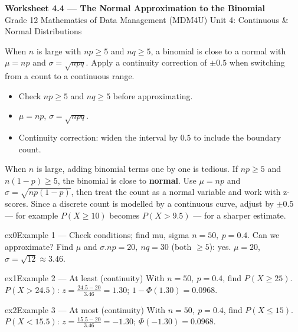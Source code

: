 \documentclass[11pt]{article}
\begin{document}
\begin{center}
{\LARGE\bfseries\color{titleblue}Worksheet 4.4 --- The Normal Approximation to the Binomial}\\[2pt]
{\small Grade 12 Mathematics of Data Management (MDM4U) \textperiodcentered{} Unit 4: Continuous \& Normal Distributions}
\end{center}

\begin{ideabox}
When $n$ is large with $np\ge5$ and $nq\ge5$, a binomial is close to a normal with $\mu=np$ and $\sigma=\sqrt{npq}$. Apply a continuity correction of $\pm0.5$ when switching from a count to a continuous range.
\begin{itemize}[leftmargin=*,itemsep=2pt]
  \item Check $np\ge5$ and $nq\ge5$ before approximating.
  \item $\mu=np$, $\sigma=\sqrt{npq}$.
  \item Continuity correction: widen the interval by $0.5$ to include the boundary count.
\end{itemize}
\end{ideabox}

\begin{learnbox}
When $n$ is large, adding binomial terms one by one is tedious. If $np\ge5$ and $n(1-p)\ge5$, the binomial is close to \textbf{normal}.
Use $\mu=np$ and $\sigma=\sqrt{np(1-p)}$, then treat the count as a normal variable and work with z-scores.
Since a discrete count is modelled by a continuous curve, adjust by $\pm0.5$ — for example $P(X\ge10)$ becomes $P(X>9.5)$ — for a sharper estimate.
\end{learnbox}


\begin{example}{ex0}{Example 1 --- Check conditions; find mu, sigma}
$n=50,\ p=0.4$. Can we approximate? Find $\mu$ and $\sigma$.\soln $np=20,\ nq=30$ (both $\ge5$): yes. $\mu=20$, $\sigma=\sqrt{12}\approx3.46$.
\end{example}

\begin{example}{ex1}{Example 2 --- At least (continuity)}
With $n=50,\ p=0.4$, find $P(X\ge25)$.\soln $P(X>24.5)$: $z=\tfrac{24.5-20}{3.46}=1.30$; $1-\Phi(1.30)=0.0968$.
\end{example}

\begin{example}{ex2}{Example 3 --- At most (continuity)}
With $n=50,\ p=0.4$, find $P(X\le15)$.\soln $P(X<15.5)$: $z=\tfrac{15.5-20}{3.46}=-1.30$; $\Phi(-1.30)=0.0968$.
\end{example}
\end{document}

